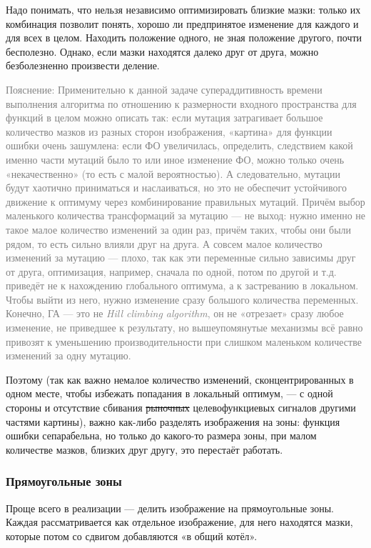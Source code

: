Надо понимать, что нельзя независимо оптимизировать близкие мазки: только их комбинация позволит понять,
хорошо ли предпринятое изменение для каждого и для всех в целом.
Находить положение одного, не зная положение другого, почти бесполезно.
Однако, если мазки находятся далеко друг от друга, можно безболезненно произвести деление.

\textcolor{gray}{Пояснение: Применительно к данной задаче супераддитивность времени выполнения алгоритма по отношению к размерности входного пространства для функций в целом
можно описать так: если мутация затрагивает большое количество мазков из разных сторон изображения, «картина» для функции ошибки очень зашумлена:
если ФО увеличилась, определить, следствием какой именно части мутаций было то или иное изменение ФО, можно только очень «некачественно» (то есть с малой вероятностью).
А следовательно, мутации будут хаотично приниматься и наслаиваться, но это не обеспечит устойчивого движение к оптимуму через комбинирование правильных мутаций.
Причём выбор маленького количества трансформаций за мутацию — не выход: нужно именно не такое малое количество изменений за один раз, причём таких, чтобы они были рядом,
то есть сильно влияли друг на друга.
А совсем малое количество изменений за мутацию — плохо, так как эти переменные сильно зависимы друг от друга, оптимизация, например, сначала по одной, потом по другой и т.д.
приведёт не к нахождению глобального оптимума, а к застреванию в локальном.
Чтобы выйти из него, нужно изменение сразу большого количества переменных.
Конечно, ГА — это не \textit{Hill climbing algorithm}, он не «отрезает» сразу любое изменение, не приведшее к результату,
но вышеупомянутые механизмы всё равно привозят к уменьшению производительности при слишком маленьком количестве изменений за одну мутацию.}

Поэтому (так как важно немалое количество изменений, сконцентрированных в одном месте, чтобы избежать попадания в локальный оптимум, — с одной стороны
и отсутствие сбивания \sout{рыночных} целевофункциевых сигналов другими частями картины),
важно как-либо разделять изображения на зоны:
функция ошибки сепарабельна, но только до какого-то размера зоны, при малом количестве мазков, близких друг другу, это перестаёт работать.


\subsubsection{Прямоугольные зоны}
Проще всего в реализации — делить изображение на прямоугольные зоны.
Каждая рассматривается как отдельное изображение, для него находятся мазки, которые потом со сдвигом добавляются «в общий котёл».

